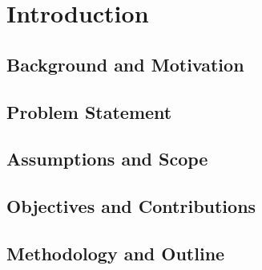 \chapter{Introduction}

\section{Background and Motivation}






\section{Problem Statement}





\section{Assumptions and Scope}



\section{Objectives and Contributions}


\section{Methodology and Outline}

